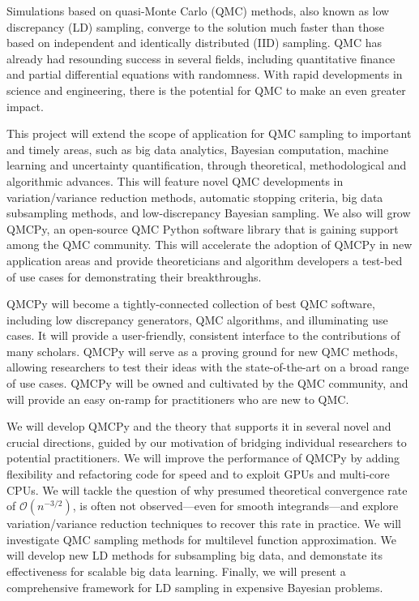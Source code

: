 \documentclass[11pt]{article}%
\begin{document}

\noindent Simulations based on quasi-Monte Carlo (QMC) methods, also known as low discrepancy (LD) sampling, converge to the solution much faster than those based on independent and identically distributed (IID) sampling.  QMC has already had resounding success in several fields, including quantitative finance and partial differential equations with randomness. With rapid developments in science and engineering, there is the potential for QMC to make an even greater impact.

This project will extend the scope of application for QMC sampling to important and timely areas, such as big data analytics, Bayesian computation, machine learning and uncertainty quantification, through theoretical, methodological and algorithmic advances. This will feature novel QMC developments in variation/variance reduction methods, automatic stopping criteria, big data subsampling methods, and low-discrepancy Bayesian sampling. We also will grow QMCPy, an open-source QMC Python software library that is gaining support among the QMC community. This will accelerate the adoption of QMCPy in new application areas and provide theoreticians and algorithm developers a test-bed of use cases for demonstrating their breakthroughs.

QMCPy will become a tightly-connected collection of best QMC software, including low discrepancy generators, QMC algorithms, and illuminating use cases. It will provide a user-friendly, consistent interface to the contributions of many scholars. QMCPy will serve as a proving ground for new QMC methods, allowing researchers to test their ideas with the state-of-the-art on a broad range of use cases. QMCPy will be owned and cultivated by the QMC community, and will provide an easy on-ramp for practitioners who are new to QMC.

\bigskip


\noindent We will develop QMCPy and the theory that supports it in several novel and crucial directions, guided by our motivation of bridging individual researchers to potential practitioners. We will improve the performance of QMCPy by adding flexibility and refactoring code for speed and to exploit GPUs and multi-core CPUs.  We will tackle the question of why presumed theoretical convergence rate of $\mathcal{O}(n^{-3/2})$, is often not observed---even for smooth integrands---and explore variation/variance reduction techniques to recover this rate in practice. We will investigate QMC sampling methods for multilevel function approximation. We will develop new LD methods for subsampling big data, and demonstate its effectiveness for scalable big data learning. Finally, we will present a comprehensive framework for LD sampling in expensive Bayesian problems.
\end{document}
